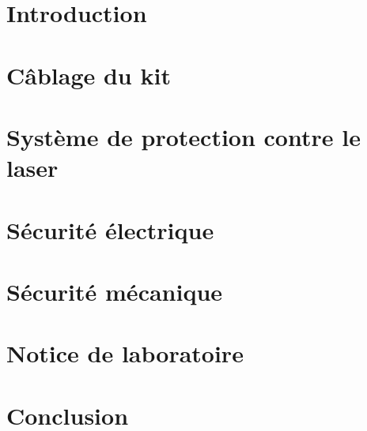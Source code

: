 \documentclass[
    iai, %
    eai, %
    confidential, %
]{heig-tb}
\begin{document}
\maketitle
\frontmatter
\clearemptydoublepage

\preamble
\authentification

\begin{abstract}
    
\end{abstract}

\clearemptydoublepage
{
    \tableofcontents
    \let\cleardoublepage\clearpage
    \listoffigures
    \let\cleardoublepage\clearpage
    \listoftables
    \let\cleardoublepage\clearpage
    \listoflistings
}

\printnomenclature
\clearemptydoublepage
{}

\mainmatter
\chapter{Introduction}

% 
\chapter{Câblage du kit}

\chapter*{Système de protection contre le laser}


\chapter{Sécurité électrique} \label{chapter:securite_electrique}

\chapter{Sécurité mécanique} \label{chapter:securite_mecanique}

\chapter{Notice de laboratoire}

\chapter{Conclusion}

\end{document}
